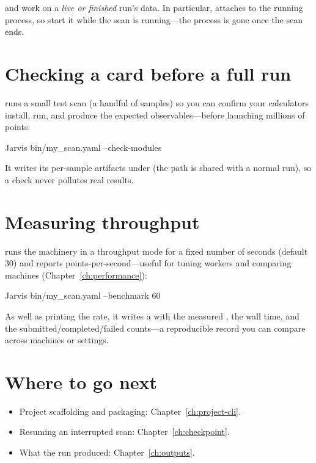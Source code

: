 \begin{jwarn}
 and  work on a \emph{live or finished} run's data. In
particular,  attaches to the running process, so start it while the scan is
running---the process is gone once the scan ends.
\end{jwarn}

\section{Checking a card before a full run}
\label{sec:cli-check}

 runs a small test scan (a handful of samples) so you can confirm your
calculators install, run, and produce the expected observables---before launching millions of
points:

\begin{shellbox}
Jarvis bin/my_scan.yaml --check-modules
\end{shellbox}

\noindent It writes its per-sample artifacts under  (the
 path is shared with a normal run), so a check never pollutes real results.

\section{Measuring throughput}
\label{sec:cli-benchmark}

 runs the machinery in a throughput mode for a fixed number of seconds (default
30) and reports points-per-second---useful for tuning workers and comparing machines
(Chapter~\ref{ch:performance}):

\begin{shellbox}
Jarvis bin/my_scan.yaml --benchmark 60
\end{shellbox}

\noindent As well as printing the rate, it writes a  with the measured
, the wall time, and the submitted/completed/failed counts---a reproducible
record you can compare across machines or settings.

\section{Where to go next}
\label{sec:cli-next}

\begin{itemize}
  \item Project scaffolding and packaging: Chapter~\ref{ch:project-cli}.
  \item Resuming an interrupted scan: Chapter~\ref{ch:checkpoint}.
  \item What the run produced: Chapter~\ref{ch:outputs}.
\end{itemize}
